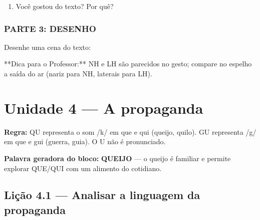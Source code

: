 \begin{exercicio}
\begin{enumerate}
  \item Você gostou do texto? Por quê?
  \begin{center}
  \underline{\hspace{12cm}}
  \end{center}

\end{enumerate}

\subsection*{PARTE 3: DESENHO}

Desenhe uma cena do texto:

\begin{center}
\end{center}

\end{exercicio}

\begin{dica}
**Dica para o Professor:** NH e LH são parecidos no gesto; compare no espelho a saída do ar (nariz para NH, laterais para LH).
\end{dica}



\chapter{Unidade 4 --- A propaganda}


\textbf{Regra:} QU representa o som /k/ em que e qui (queijo, quilo). GU representa /g/ em que e gui (guerra, guia). O U não é pronunciado.

\textbf{Palavra geradora do bloco:} \textbf{QUEIJO} --- o queijo é familiar e permite explorar QUE/QUI com um alimento do cotidiano.

\section{Lição 4.1 --- Analisar a linguagem da propaganda}

